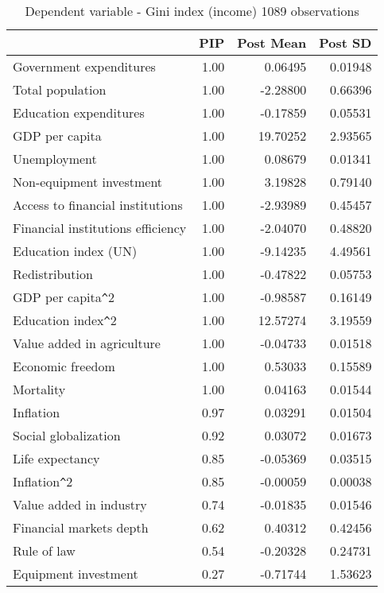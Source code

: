 \documentclass[a4paper,11pt]{article}
\begin{document}
\small
\begin{table}[!ht]
\footnotesize
\centering
\caption{Dependent variable - Gini index (income) 1089 observations}
\label{table:gini1y}
\begin{tabular}{lrrr}
  \toprule
  & PIP & Post Mean & Post SD \\
  \hline
  Government expenditures & 1.00 & 0.06495 & 0.01948 \\
  Total population & 1.00 & -2.28800 & 0.66396 \\
  Education expenditures & 1.00 & -0.17859 & 0.05531 \\ 
  GDP per capita & 1.00 & 19.70252 & 2.93565 \\
  Unemployment & 1.00 & 0.08679 & 0.01341 \\ 
  Non-equipment investment & 1.00 & 3.19828 & 0.79140 \\ 
  Access to financial institutions & 1.00 & -2.93989 & 0.45457 \\
  Financial institutions efficiency & 1.00 & -2.04070 & 0.48820 \\ 
  Education index (UN) & 1.00 & -9.14235 & 4.49561 \\
  Redistribution & 1.00 & -0.47822 & 0.05753 \\ 
  GDP per capita\verb|^|2 & 1.00 & -0.98587 & 0.16149 \\
  Education index\verb|^|2 & 1.00 & 12.57274 & 3.19559 \\
  Value added in agriculture & 1.00 & -0.04733 & 0.01518 \\ 
  Economic freedom & 1.00 & 0.53033 & 0.15589 \\ 
  Mortality & 1.00 & 0.04163 & 0.01544 \\
  Inflation & 0.97 & 0.03291 & 0.01504 \\
  Social globalization & 0.92 & 0.03072 & 0.01673 \\
  Life expectancy & 0.85 & -0.05369 & 0.03515 \\ 
  Inflation\verb|^|2 & 0.85 & -0.00059 & 0.00038 \\ 
  Value added in industry & 0.74 & -0.01835 & 0.01546 \\ 
  Financial markets depth & 0.62 & 0.40312 & 0.42456 \\
  Rule of law & 0.54 & -0.20328 & 0.24731 \\ 
  Equipment investment & 0.27 & -0.71744 & 1.53623 \\

\end{tabular}
\end{table}
\end{document}
